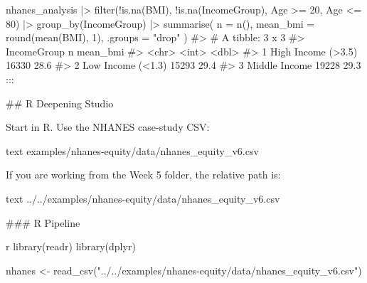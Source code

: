\documentclass[
  letterpaper,
  DIV=11,
  numbers=noendperiod,
  oneside]{scrreprt}
\newenvironment{Shaded}{\begin{snugshade}}{\end{snugshade}}
\newcommand{\AttributeTok}[1]{\textcolor[rgb]{0.40,0.45,0.13}{#1}}
\newcommand{\CommentTok}[1]{\textcolor[rgb]{0.37,0.37,0.37}{#1}}
\newcommand{\DecValTok}[1]{\textcolor[rgb]{0.68,0.00,0.00}{#1}}
\newcommand{\FunctionTok}[1]{\textcolor[rgb]{0.28,0.35,0.67}{#1}}
\newcommand{\InformationTok}[1]{\textcolor[rgb]{0.37,0.37,0.37}{#1}}
\newcommand{\NormalTok}[1]{\textcolor[rgb]{0.00,0.23,0.31}{#1}}
\newcommand{\OtherTok}[1]{\textcolor[rgb]{0.00,0.23,0.31}{#1}}
\newcommand{\SpecialCharTok}[1]{\textcolor[rgb]{0.37,0.37,0.37}{#1}}
\newcommand{\StringTok}[1]{\textcolor[rgb]{0.13,0.47,0.30}{#1}}
\begin{document}
\begin{Shaded}
\begin{Highlighting}[numbers=left,,]
\NormalTok{nhanes\_analysis }\SpecialCharTok{|\textgreater{}}
  \FunctionTok{filter}\NormalTok{(}\SpecialCharTok{!}\FunctionTok{is.na}\NormalTok{(BMI), }\SpecialCharTok{!}\FunctionTok{is.na}\NormalTok{(IncomeGroup), Age }\SpecialCharTok{\textgreater{}=} \DecValTok{20}\NormalTok{, Age }\SpecialCharTok{\textless{}=} \DecValTok{80}\NormalTok{) }\SpecialCharTok{|\textgreater{}}
  \FunctionTok{group\_by}\NormalTok{(IncomeGroup) }\SpecialCharTok{|\textgreater{}}
  \FunctionTok{summarise}\NormalTok{(}
    \AttributeTok{n =} \FunctionTok{n}\NormalTok{(),}
    \AttributeTok{mean\_bmi =} \FunctionTok{round}\NormalTok{(}\FunctionTok{mean}\NormalTok{(BMI), }\DecValTok{1}\NormalTok{),}
    \AttributeTok{.groups =} \StringTok{"drop"}
\NormalTok{  )}
\CommentTok{\#\textgreater{} \# A tibble: 3 x 3}
\CommentTok{\#\textgreater{}   IncomeGroup            n mean\_bmi}
\CommentTok{\#\textgreater{}   \textless{}chr\textgreater{}              \textless{}int\textgreater{}    \textless{}dbl\textgreater{}}
\CommentTok{\#\textgreater{} 1 High Income (\textgreater{}3.5) 16330     28.6}
\CommentTok{\#\textgreater{} 2 Low Income (\textless{}1.3)  15293     29.4}
\CommentTok{\#\textgreater{} 3 Middle Income      19228     29.3}
\InformationTok{\textasciigrave{}\textasciigrave{}\textasciigrave{}}
\NormalTok{:::}



\FunctionTok{\#\# R Deepening Studio}

\NormalTok{Start in R. Use the NHANES case{-}study CSV:}

\InformationTok{\textasciigrave{}\textasciigrave{}\textasciigrave{}text}
\InformationTok{examples/nhanes{-}equity/data/nhanes\_equity\_v6.csv}
\InformationTok{\textasciigrave{}\textasciigrave{}\textasciigrave{}}

\NormalTok{If you are working from the Week 5 folder, the relative path is:}

\InformationTok{\textasciigrave{}\textasciigrave{}\textasciigrave{}text}
\InformationTok{../../examples/nhanes{-}equity/data/nhanes\_equity\_v6.csv}
\InformationTok{\textasciigrave{}\textasciigrave{}\textasciigrave{}}

\FunctionTok{\#\#\# R Pipeline}

\InformationTok{\textasciigrave{}\textasciigrave{}\textasciigrave{}r}
\FunctionTok{library}\NormalTok{(readr)}
\FunctionTok{library}\NormalTok{(dplyr)}

\NormalTok{nhanes }\OtherTok{\textless{}{-}} \FunctionTok{read\_csv}\NormalTok{(}\StringTok{"../../examples/nhanes{-}equity/data/nhanes\_equity\_v6.csv"}\NormalTok{)}


\end{Highlighting}
\end{Shaded}
\end{document}
